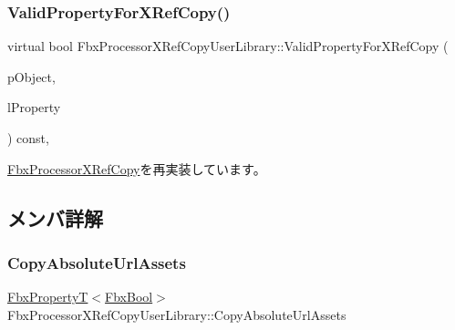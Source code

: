 \subsubsection{\texorpdfstring{Valid\+Property\+For\+X\+Ref\+Copy()}{ValidPropertyForXRefCopy()}}
{\footnotesize\ttfamily virtual bool Fbx\+Processor\+X\+Ref\+Copy\+User\+Library\+::\+Valid\+Property\+For\+X\+Ref\+Copy (\begin{DoxyParamCaption}\item[{\hyperlink{class_fbx_object}{Fbx\+Object} $\ast$}]{p\+Object,  }\item[{\hyperlink{class_fbx_property}{Fbx\+Property} \&}]{l\+Property }\end{DoxyParamCaption}) const\hspace{0.3cm}{\ttfamily [protected]}, {\ttfamily [virtual]}}



\hyperlink{class_fbx_processor_x_ref_copy_a528c9b217f22eb04f68d3687774a18fd}{Fbx\+Processor\+X\+Ref\+Copy}を再実装しています。



\subsection{メンバ詳解}
\mbox{\label{class_fbx_processor_x_ref_copy_user_library_a8adc7c6c058547ca3ec8ea4e3589f25e}} 
\subsubsection{\texorpdfstring{Copy\+Absolute\+Url\+Assets}{CopyAbsoluteUrlAssets}}
{\footnotesize\ttfamily \hyperlink{class_fbx_property_t}{Fbx\+PropertyT}$<$\hyperlink{fbxtypes_8h_a92e0562b2fe33e76a242f498b362262e}{Fbx\+Bool}$>$ Fbx\+Processor\+X\+Ref\+Copy\+User\+Library\+::\+Copy\+Absolute\+Url\+Assets}

\mbox{\label{class_fbx_processor_x_ref_copy_user_library_aa10de06980a40ae19f01a4407fbd6b9a}} 
